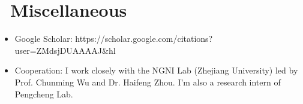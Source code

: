 \documentclass{resume}
\begin{document}

\section{\faInfo\ Miscellaneous}
\begin{itemize}[parsep=0.5ex]
  \item Google Scholar: https://scholar.google.com/citations?user=ZMdsjDUAAAAJ\&hl
  \item Cooperation: I work closely with the NGNI Lab (Zhejiang University) led by Prof. Chunming Wu and Dr. Haifeng Zhou. I'm also a research intern of Pengcheng Lab.
\end{itemize}

%
%
\end{document}
